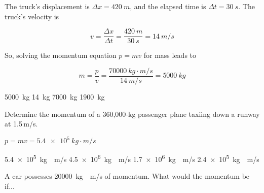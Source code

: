 \documentclass[]{exam}
\begin{document}
\begin{questions}
\begin{solution}
The truck's displacement is $\Delta x = \SI{420}{m}$, and the elapsed time is $\Delta t = \SI{30}{s}$. The truck's velocity is

\begin{equation*}
    v = \frac{\Delta x}{\Delta t} = \frac{\SI{420}{m}}{\SI{30}{s}} = \SI{14}{m/s}
\end{equation*}

So, solving the momentum equation $p = mv$ for mass leads to 

\begin{equation*}
    m = \frac{p}{v} = \frac{\SI[group-separator={,}]{70000}{kg\cdot m/s}}{\SI{14}{m/s}} = \boxed{\SI{5000}{kg}}
\end{equation*}
\end{solution}

\begin{randomizechoices}
    \correctchoice \SI{5000}{kg}
    \choice \SI{14}{kg}
    \choice \SI{7000}{kg}
    \choice \SI{1900}{kg}
\end{randomizechoices}

\question %
Determine the momentum of a 360,000-kg passenger plane taxiing down a runway at 1.5\,m/s. 

\ifprintanswers
{\color{red}
$p = mv = \boxed{\SI{5.4e5}{kg\cdot m/s}}$
}
\fi

\begin{randomizechoices}
    \correctchoice \SI{5.4e5}{kg\cdot m/s}
    \choice \SI{4.5e6}{kg\cdot m/s}
    \choice \SI{1.7e6}{kg\cdot m/s}
    \choice \choice \SI{2.4e5}{kg\cdot m/s}
\end{randomizechoices}

\question
A car possesses \SI[group-separator={,}]{20000}{kg\cdot m/s} of momentum. What would the momentum be if...

\end{questions}
\end{document}
